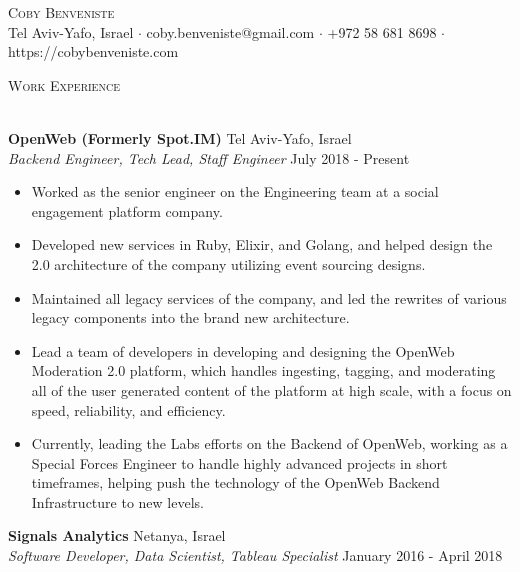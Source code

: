 \documentclass[a4paper]{article}
\newcommand{\lineunder} {
    \vspace*{-8pt} \\
    \hspace*{-18pt} \hrulefill \\
}
\newcommand{\header} [1] {
    {\hspace*{-18pt}\vspace*{6pt} \textsc{#1}}
    \vspace*{-6pt} \lineunder
}
\begin{document}
\vspace*{-40pt}

    

\vspace*{-10pt}
\begin{center}
	{\Huge \scshape {Coby Benveniste}}\\
	Tel Aviv-Yafo, Israel $\cdot$ coby.benveniste@gmail.com $\cdot$ +972 58 681 8698 $\cdot$ https://cobybenveniste.com\\
\end{center}



\header{Work Experience}
\vspace{1mm}

\textbf{OpenWeb (Formerly Spot.IM)} \hfill Tel Aviv-Yafo, Israel\\
\textit{Backend Engineer, Tech Lead, Staff Engineer} \hfill July 2018 - Present\\
\vspace{-1mm}
\begin{itemize} \itemsep 1pt
	\item Worked as the senior engineer on the Engineering team at a social engagement platform company.
	\item Developed new services in Ruby, Elixir, and Golang, and helped design the 2.0 architecture of the company utilizing event sourcing designs.
	\item Maintained all legacy services of the company, and led the rewrites of various legacy components into the brand new architecture.
	\item Lead a team of developers in developing and designing the OpenWeb Moderation 2.0 platform, which handles ingesting, tagging, and moderating all of the user generated content of the platform at high scale, with a focus on speed, reliability, and efficiency.
	\item Currently, leading the Labs efforts on the Backend of OpenWeb, working as a \textquotedbl{}Special Forces Engineer\textquotedbl{} to handle highly advanced projects in short timeframes, helping push the technology of the OpenWeb Backend Infrastructure to new levels.
\end{itemize}
\textbf{Signals Analytics} \hfill Netanya, Israel\\
\textit{Software Developer, Data Scientist, Tableau Specialist} \hfill January 2016 - April 2018\\
\vspace{-1mm}
\end{document}
